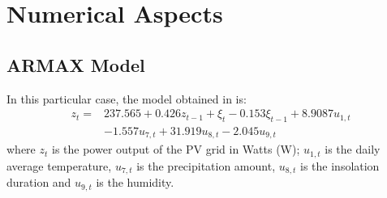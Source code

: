 \section{Numerical Aspects}\label{sec:numAsp}
\subsection{ARMAX Model}
In this particular case, the model obtained in \cite{li2014armax} is:
\begin{equation}
\begin{aligned} z_{t}=& 237.565+0.426z_{t-1}+\xi_{t}-0.153 \xi_{t-1}+8.9087u_{1, t} \\ &-1.557 u_{7, t}+31.919 u_{8, t}-2.045u_{9, t}
\end{aligned}
\end{equation}
where $z_t$ is the power output of the PV grid in Watts (W); $u_{1,t}$ is the daily average temperature, $u_{7,t}$ is the precipitation amount, $u_{8,t}$ is the insolation duration and $u_{9,t}$ is the humidity.
